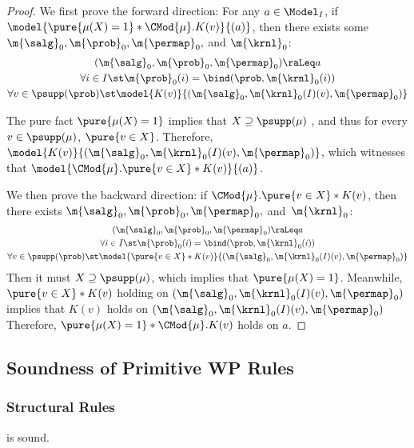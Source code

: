 \begin{proof}
  We first prove the forward direction:
  For any $a \in \Model_I$,
  if $\model{\pure{\mu(X) = 1} \ast \CMod{\mu}. K(v)}{(a)}$,
  then there exists some
  $\m{\salg}_0, \m{\prob}_0,\m{\permap}_0,$ and $ \m{\krnl}_0 $:
  \begin{gather*}
    (\m{\salg}_0, \m{\prob}_0,\m{\permap}_0) \raLeq a
    \\
    \forall i\in I\st
      \m{\prob}_0(i) = \bind(\prob, \m{\krnl}_0(i)) \\
      \forall v \in \psupp(\prob) \st
      \model{K(v)}{(\m{\salg}_0, \m{\krnl}_0(I)(v), \m{\permap}_0)}
  \end{gather*}

   The pure fact $\pure{\mu(X) = 1}$ implies that
   $X \supseteq \psupp(\mu)$ , and thus
   for every $v \in \psupp(\mu)$, $\pure{v \in X}$.
   Therefore, $\model{K(v)}{(\m{\salg}_0, \m{\krnl}_0(I)(v), \m{\permap}_0)}$,
   which witnesses that
   $\model{\CMod{\mu}. \pure{v \in X} \ast K(v)}{(a)}$.

  We then prove the backward direction:
  if $\CMod{\mu}. \pure{v \in X} \ast K(v) $,
  then there exists
    $\m{\salg}_0, \m{\prob}_0,\m{\permap}_0,$ and~$ \m{\krnl}_0 $:
  \begin{gather*}
    (\m{\salg}_0, \m{\prob}_0,\m{\permap}_0) \raLeq a
    \\
    \forall i\in I\st
      \m{\prob}_0(i) = \bind(\prob, \m{\krnl}_0(i)) \\
      \forall v \in \psupp(\prob) \st
      \model{\pure{v \in X} \ast K(v)}{(\m{\salg}_0, \m{\krnl}_0(I)(v), \m{\permap}_0)}
  \end{gather*}
  Then it must $X \supseteq \psupp(\mu)$,
  which implies that $\pure{\mu(X) = 1}$.
  Meanwhile, $\pure{v \in X} \ast K(v)$ holding on ${(\m{\salg}_0, \m{\krnl}_0(I)(v), \m{\permap}_0)}$
  implies that $K(v)$ holds on
  ${(\m{\salg}_0, \m{\krnl}_0(I)(v), \m{\permap}_0)}$
  Therefore, $\pure{\mu(X) = 1} \ast \CMod{\mu}. K(v)$ holds on $a$.
\end{proof}
 

\subsection{Soundness of Primitive WP Rules}
\label{sec:appendix:wp-rules}


\subsubsection{Structural Rules}
\begin{lemma}
\label{proof:wp-cons}
   is sound.
\end{lemma}

